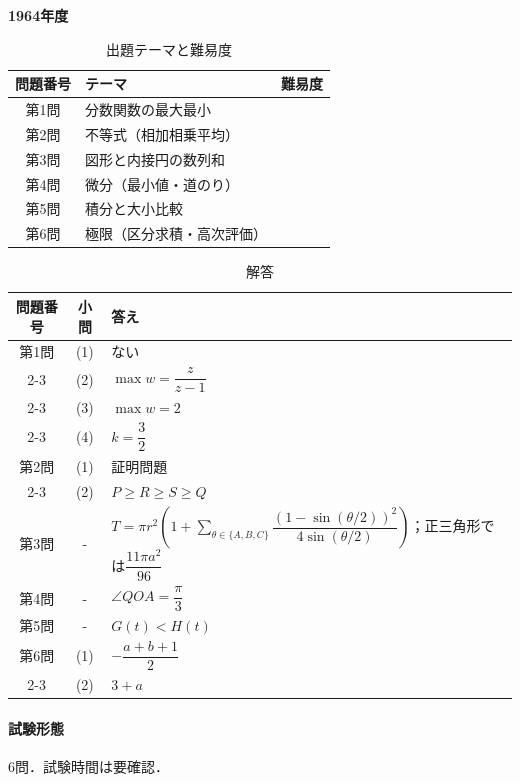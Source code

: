 \documentclass[../../main.tex]{subfiles}
\begin{document}
\begin{center}
  {\fontsize{48pt}{58pt}\selectfont \textbf{1964}\normalsize\textbf{年度}}
\end{center}

\begin{table}[htb]
  \centering
  \caption{出題テーマと難易度}
  \begin{tabular}{|c|p{9cm}|c|}
    \hline
    \textbf{問題番号} & \textbf{テーマ} & \textbf{難易度} \\
    \hline
    第1問 & 分数関数の最大最小 & \\
    \hline
    第2問 & 不等式（相加相乗平均） & \\
    \hline
    第3問 & 図形と内接円の数列和 & \\
    \hline
    第4問 & 微分（最小値・道のり） & \\
    \hline
    第5問 & 積分と大小比較 & \\
    \hline
    第6問 & 極限（区分求積・高次評価） & \\
    \hline
  \end{tabular}
\end{table}

\begin{table}[htb]
  \centering
  \caption{解答}
  \renewcommand{\arraystretch}{1.4}
  \begin{tabular}{|c|c|p{9cm}|}
    \hline
    \textbf{問題番号} & \textbf{小問} & \textbf{答え} \\
    \hline
    第1問 & (1) & ない \\
    \cline{2-3}
    & (2) & $\max w=\dfrac{z}{z-1}$ \\
    \cline{2-3}
    & (3) & $\max w=2$ \\
    \cline{2-3}
    & (4) & $k=\dfrac{3}{2}$ \\
    \hline
    第2問 & (1) & 証明問題 \\
    \cline{2-3}
    & (2) & $P\ge R\ge S\ge Q$ \\
    \hline
    第3問 & - & $T=\pi r^2\left(1+\sum_{\theta\in\{A,B,C\}}\dfrac{(1-\sin(\theta/2))^2}{4\sin(\theta/2)}\right)$；正三角形では$\dfrac{11\pi a^2}{96}$ \\
    \hline
    第4問 & - & $\angle QOA=\dfrac{\pi}{3}$ \\
    \hline
    第5問 & - & $G(t)<H(t)$ \\
    \hline
    第6問 & (1) & $-\dfrac{a+b+1}{2}$ \\
    \cline{2-3}
    & (2) & $3+a$ \\
    \hline
  \end{tabular}
\end{table}

\paragraph{試験形態}
6問．試験時間は要確認．
\end{document}
